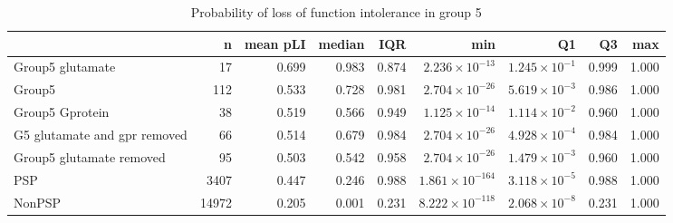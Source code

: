 \begin{table}[ht]
\centering
\setlength{\extrarowheight}{2pt}
\begin{adjustbox}{width=\textwidth}
\begin{tabular}{lrrrrrrrr}
  \toprule
 & n & mean pLI & median & IQR & min & Q1 & Q3 & max \\ 
  \midrule
Group5 glutamate & 17 & 0.699 & 0.983 & 0.874 & $2.236 \times 10^{-13}$ & $1.245 \times 10^{-1}$ & 0.999 & 1.000 \\ 
  Group5 & 112 & 0.533 & 0.728 & 0.981 & $2.704 \times 10^{-26}$ & $5.619 \times 10^{-3}$ & 0.986 & 1.000 \\ 
  Group5 Gprotein & 38 & 0.519 & 0.566 & 0.949 & $1.125 \times 10^{-14}$ & $1.114 \times 10^{-2}$ & 0.960 & 1.000 \\ 
  G5 glutamate and gpr removed & 66 & 0.514 & 0.679 & 0.984 & $2.704 \times 10^{-26}$ & $4.928 \times 10^{-4}$ & 0.984 & 1.000 \\ 
  Group5 glutamate removed & 95 & 0.503 & 0.542 & 0.958 & $2.704 \times 10^{-26}$ & $1.479 \times 10^{-3}$ & 0.960 & 1.000 \\ 
  PSP & 3407 & 0.447 & 0.246 & 0.988 & $1.861 \times 10^{-164}$ & $3.118 \times 10^{-5}$ & 0.988 & 1.000 \\ 
  NonPSP & 14972 & 0.205 & 0.001 & 0.231 & $8.222 \times 10^{-118}$ & $2.068 \times 10^{-8}$ & 0.231 & 1.000 \\ 
   \bottomrule
\end{tabular}
\end{adjustbox}
\caption{Probability of loss of function intolerance in group 5} 
\label{tab:Probability of loss of function intolerance in group 5}
\end{table}



